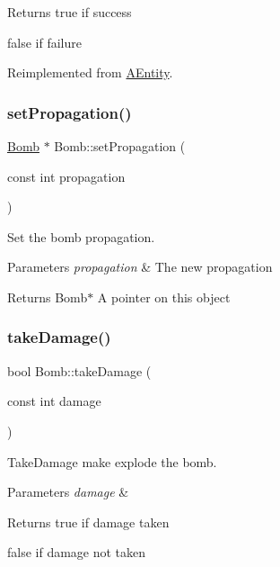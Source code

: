 \begin{DoxyReturn}{Returns}
true if success 

false if failure 
\end{DoxyReturn}


Reimplemented from \hyperlink{class_a_entity_ae2faa1d11e21033a223fef2bc03b9338}{A\+Entity}.

\mbox{\label{class_bomb_a3a3488cb6bd66f3b6d73003814dfb209}} 
\subsubsection{\texorpdfstring{set\+Propagation()}{setPropagation()}}
{\footnotesize\ttfamily \hyperlink{class_bomb}{Bomb} $\ast$ Bomb\+::set\+Propagation (\begin{DoxyParamCaption}\item[{const int}]{propagation }\end{DoxyParamCaption})}



Set the bomb propagation. 


\begin{DoxyParams}{Parameters}
{\em propagation} & The new propagation \\
\hline
\end{DoxyParams}
\begin{DoxyReturn}{Returns}
Bomb$\ast$ A pointer on this object 
\end{DoxyReturn}
\mbox{\label{class_bomb_ac51b260cdfef0cde903a88003994276e}} 
\subsubsection{\texorpdfstring{take\+Damage()}{takeDamage()}}
{\footnotesize\ttfamily bool Bomb\+::take\+Damage (\begin{DoxyParamCaption}\item[{const int}]{damage }\end{DoxyParamCaption})\hspace{0.3cm}{\ttfamily [virtual]}}



Take\+Damage make explode the bomb. 


\begin{DoxyParams}{Parameters}
{\em damage} & \\
\hline
\end{DoxyParams}
\begin{DoxyReturn}{Returns}
true if damage taken 

false if damage not taken 
\end{DoxyReturn}


